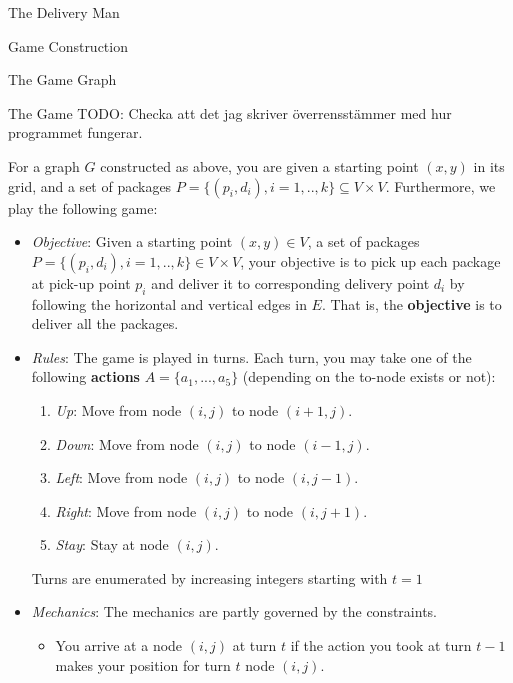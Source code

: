 \begin{section}{The Delivery Man}
\begin{subsection}{Game Construction}
\begin{subsubsection}{The Game Graph}
    \end{subsubsection}
    
    \begin{subsubsection}{The Game}
      TODO: Checka att det jag skriver överrensstämmer med hur programmet fungerar.

       For a graph $G$ constructed as above, you are given a starting point $(x, y)$ in its grid, and a set of packages $P = \{(p_i, d_i), i = 1, .., k\} \subseteq V\times V$. Furthermore, we play the following game:
      \begin{itemize}

        \item \textit{Objective}: Given a starting point $(x, y) \in V$, a set of packages $P = \{(p_i, d_i), i = 1, .., k\} \in V\times V$, your objective is to pick up each package at pick-up point $p_i$ and deliver it to corresponding delivery point $d_i$ by following the horizontal and vertical edges in $E$. That is, the \textbf{objective} is to deliver all the packages.

        \item \textit{Rules}:
          The game is played in turns. Each turn, you may take one of the following \textbf{actions} $A = \{a_1, ..., a_5 \}$ (depending on the to-node exists or not):
          \begin{enumerate}
          \item \textit{Up}: Move from node $(i, j)$ to node $(i+1, j)$.
          \item \textit{Down}: Move from node $(i, j)$ to node $(i-1, j)$.
          \item \textit{Left}: Move from node $(i, j)$ to node $(i, j-1)$.
          \item \textit{Right}: Move from node $(i, j)$ to node $(i, j+1)$.
          \item \textit{Stay}: Stay at node $(i, j)$.
          \end{enumerate}

          Turns are enumerated by increasing integers starting with $t = 1$

        \item \textit{Mechanics}:
          The mechanics are partly governed by the constraints.
          \begin{itemize}
          \item You arrive at a node $(i, j)$ at turn $t$ if the action you took at turn $t-1$ makes your position for turn $t$ node $(i, j)$.
            

\end{itemize}
\end{itemize}
\end{subsubsection}
\end{subsection}
\end{section}
